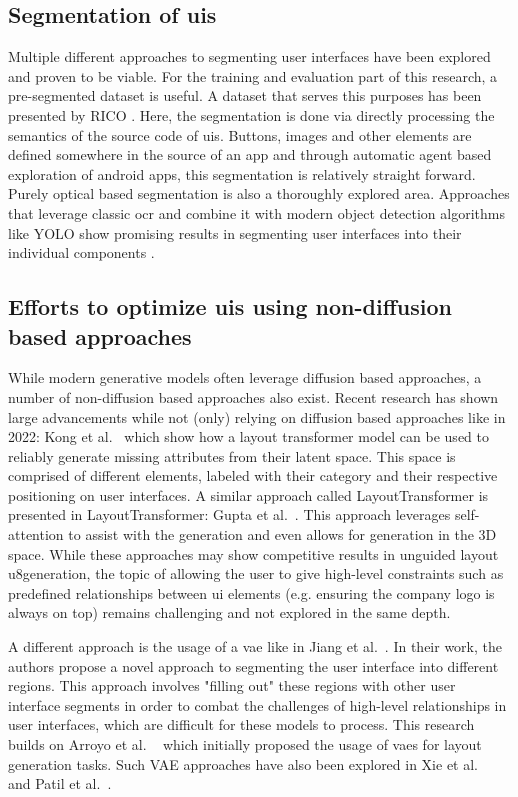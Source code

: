 \documentclass[10pt,a4paper]{scrartcl} %
\begin{document}
\subsection{Segmentation of \acp{ui}}
Multiple different approaches to segmenting user interfaces have been explored and proven to be viable. For the training and evaluation part of this research, a pre-segmented dataset is useful. A dataset that serves this purposes has been presented by RICO \cite{10.1145/3126594.3126651}. Here, the segmentation is done via directly processing the semantics of the source code of \acp{ui}. Buttons, images and other elements are defined somewhere in the source of an app and through automatic agent based exploration of android apps, this segmentation is relatively straight forward.
Purely optical based segmentation is also a thoroughly explored area. Approaches that leverage classic \ac{ocr} and combine it with modern object detection algorithms like YOLO \cite{Terven_2023} show promising results in segmenting user interfaces into their individual components \cite{10.1145/3368089.3409691}.

\subsection{Efforts to optimize \acp{ui} using non-diffusion based approaches}
While modern generative models often leverage diffusion based approaches, a number of non-diffusion based approaches also exist. Recent research has shown large advancements while not (only) relying on diffusion based approaches like in 2022: Kong et al.~\cite{kong2022blt} which show how a layout transformer model can be used to reliably generate missing attributes from their latent space. This space is comprised of different elements, labeled with their category and their respective positioning on user interfaces.
A similar approach called LayoutTransformer is presented in LayoutTransformer: Gupta et al.~\cite{gupta2021layouttransformer}. This approach leverages self-attention to assist with the generation and even allows for generation in the 3D space.
While these approaches may show competitive results in unguided layout u8generation, the topic of allowing the user to give high-level constraints such as predefined relationships between \ac{ui} elements (e.g. ensuring the company logo is always on top) remains challenging and not explored in the same depth.

A different approach is the usage of a \ac{vae} like in Jiang et al.~\cite{Jiang_Sun_Zhu_Lou_Zhang_2022}. In their work, the authors propose a novel approach to segmenting the user interface into different regions. This approach involves "filling out" these regions with other user interface segments in order to combat the challenges of high-level relationships in user interfaces, which are difficult for these models to process. This research builds on Arroyo et al. ~\cite{arroyo2021variational} which initially proposed the usage of \acp{vae} for layout generation tasks. Such VAE approaches have also been explored in Xie et al.~\cite{xie2021canvasemb} and Patil et al.~\cite{patil2020read}.
\end{document}
